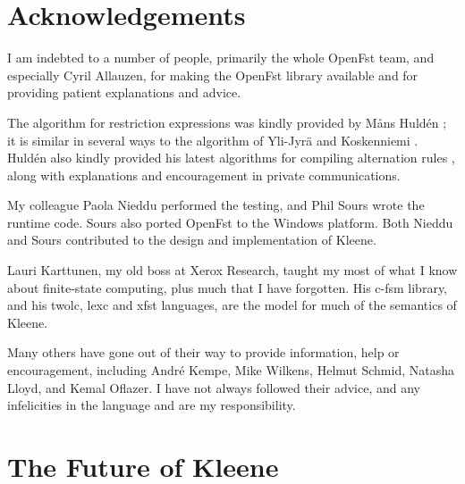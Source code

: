 \section{Acknowledgements}

I am indebted to a number of people, primarily the whole OpenFst team,
and especially Cyril Allauzen, for making the OpenFst library
\citep{allauzen+riley+schalkwyk+skut+mohri:2007} available and for
providing patient explanations and advice.

The algorithm for restriction expressions was kindly provided by M\r{a}ns
Huld\'en \citep{hulden:2009fsmnlp,hulden:2009thesis}; it is similar in
several ways to the algorithm of Yli-Jyr\"a and Koskenniemi
\citep{yli-jyra+koskenniemi:2004}.  Huld\'en also kindly provided his
latest algorithms for compiling alternation rules
\citep{hulden:2009thesis}, along with explanations and encouragement in
private communications.

My  colleague Paola Nieddu performed the testing, and Phil
Sours wrote the   runtime code.  Sours also
ported OpenFst to the Windows platform.  Both Nieddu and Sours
contributed to the design and implementation of Kleene.

Lauri Karttunen, my old boss at Xerox Research, taught my most of what I know about finite-state
computing, plus much that I have forgotten.  His c-fsm library, and his
twolc, lexc and xfst languages, are the model for
much of the semantics of Kleene.

Many others have gone out of their way to provide information, help or
encouragement, including Andr\'e Kempe, Mike Wilkens,
Helmut Schmid, Natasha Lloyd, and Kemal Oflazer.  I have not always
followed their advice, and any infelicities in the \Kleene{} language and
 are my responsibility.

\section{The Future of Kleene}

